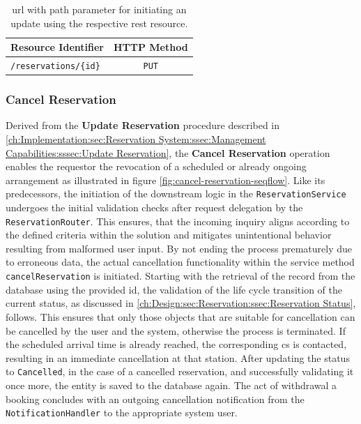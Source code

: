 \begingroup
\setlength{\tabcolsep}{10pt} %
\renewcommand{\arraystretch}{1.5} %
\begin{table}[h]
\centering
\caption{\acrshort{url} with path parameter for initiating an update using the respective \acrshort{rest} resource.}
    \begin{tabular}{l|c}
    Resource Identifier & HTTP Method \\ \hline
    \texttt{/reservations/\{id\}} & \texttt{PUT}
    \end{tabular}
\label{tab:update-reservation-rest}
\end{table}
\endgroup

\newpage

\subsubsection{Cancel Reservation}
\label{ch:Implementation:sec:Reservation System:ssec:Management Capabilities:sssec:Cancel Reservation}

Derived from the \textbf{Update Reservation} procedure described in \ref{ch:Implementation:sec:Reservation System:ssec:Management Capabilities:sssec:Update Reservation}, the \textbf{Cancel Reservation} operation enables the requestor the revocation of a scheduled or already ongoing arrangement as illustrated in figure \ref{fig:cancel-reservation-seqflow}.
Like its predecessors, the initiation of the downstream logic in the \texttt{ReservationService} undergoes the initial validation checks after request delegation by the \texttt{ReservationRouter}.
This ensures, that the incoming inquiry aligns according to the defined criteria within the solution and mitigates unintentional behavior resulting from malformed user input.
By not ending the process prematurely due to erroneous data, the actual cancellation functionality within the service method \texttt{cancelReservation} is initiated.
Starting with the retrieval of the record from the database using the provided \acrshort{id}, the validation of the life cycle transition of the current status, as discussed in \ref{ch:Design:sec:Reservation:ssec:Reservation Status}, follows.
This ensures that only those objects that are suitable for cancellation can be cancelled by the user and the system, otherwise the process is terminated.
If the scheduled arrival time is already reached, the corresponding \acrshort{cs} is contacted, resulting in an immediate cancellation at that station.
After updating the status to \texttt{Cancelled}, in the case of a cancelled reservation, and successfully validating it once more, the entity is saved to the database again. The act of withdrawal a booking concludes with an outgoing cancellation notification from the \texttt{NotificationHandler} to the appropriate system user.


